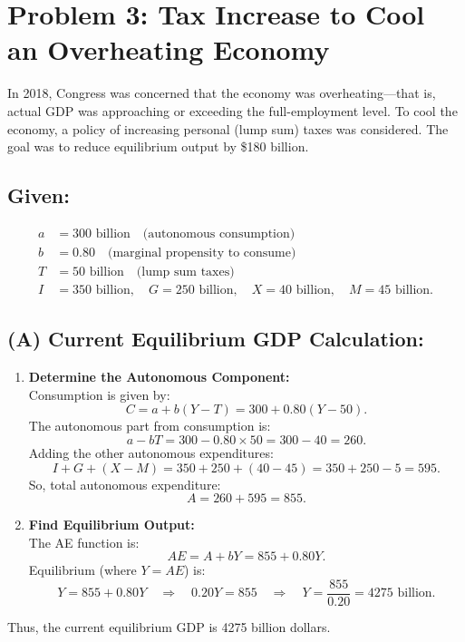 \documentclass{article}
\begin{document}
\section*{Problem 3: Tax Increase to Cool an Overheating Economy}
In 2018, Congress was concerned that the economy was overheating—that is, actual GDP was approaching or exceeding the full-employment level. To cool the economy, a policy of increasing personal (lump sum) taxes was considered. The goal was to reduce equilibrium output by \$180 billion.

\subsection*{Given:}
\[
\begin{aligned}
a &= 300\text{ billion} \quad\text{(autonomous consumption)} \\
b &= 0.80 \quad\text{(marginal propensity to consume)} \\
T &= 50\text{ billion} \quad\text{(lump sum taxes)} \\
I &= 350\text{ billion}, \quad G=250\text{ billion}, \quad X=40\text{ billion}, \quad M=45\text{ billion.}
\end{aligned}
\]

\subsection*{(A) Current Equilibrium GDP Calculation:}
\begin{enumerate}[label=\arabic*.]
  \item \textbf{Determine the Autonomous Component:}\\[1mm]
    Consumption is given by:
    \[
      C = a + b(Y-T) = 300 + 0.80(Y-50).
    \]
    The autonomous part from consumption is:
    \[
      a - bT = 300 - 0.80 \times 50 = 300 - 40 = 260.
    \]
    Adding the other autonomous expenditures:
    \[
      I + G + (X-M) = 350 + 250 + (40-45) = 350 + 250 - 5 = 595.
    \]
    So, total autonomous expenditure:
    \[
      A = 260 + 595 = 855.
    \]
  \item \textbf{Find Equilibrium Output:}\\[1mm]
    The AE function is:
    \[
      AE = A + bY = 855 + 0.80Y.
    \]
    Equilibrium (where \(Y = AE\)) is:
    \[
      Y = 855 + 0.80Y \quad \Rightarrow \quad 0.20Y = 855 \quad \Rightarrow \quad Y = \frac{855}{0.20} = 4275\text{ billion}.
    \]
\end{enumerate}
Thus, the current equilibrium GDP is 4275 billion dollars.
\end{document}
